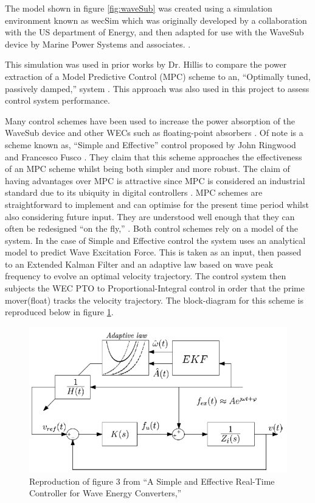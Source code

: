 \documentclass{report}
\begin{document}
The model shown in figure \ref{fig:waveSub}  was created using a simulation environment known as wecSim\cite{wecSim} which was originally developed by a collaboration with the US department of Energy, and then adapted for use with the WaveSub device by Marine Power Systems and associates. \cite{waveSub}.

This simulation was used in prior works by Dr. Hillis to compare the power extraction of a Model Predictive Control (MPC) scheme to an, ``Optimally tuned, passively damped,'' system \cite{andyMPC}. This approach was also used in this project to assess control system performance. 

Many control schemes have been used to increase the power absorption of the WaveSub device and other WECs such as floating-point absorbers \cite{abdelkhalik2017a}\cite{abdelkhalik2018a}. Of note is a scheme known as, ``Simple and Effective'' control proposed by John Ringwood and Francesco Fusco \cite{ringwood}. They claim that this scheme approaches the effectiveness of an MPC scheme whilst being both simpler and more robust. The claim of having advantages over MPC is attractive since MPC is considered an industrial standard due to its ubiquity in digital controllers \cite{gorinevsky2005a}. MPC schemes are straightforward to implement and can optimise for the present time period whilst also considering future input. They are understood well enough that they can often be redesigned ``on the fly,'' \cite{gorinevsky2005a}. Both control schemes rely on a model of the system. In the case of Simple and Effective control the system uses an analytical model to predict Wave Excitation Force. This is taken as an input, then passed to an Extended Kalman Filter and an adaptive law based on wave peak frequency to evolve an optimal velocity trajectory. The control system then subjects the WEC PTO to Proportional-Integral control in order that the prime mover(float) tracks the velocity trajectory. The block-diagram for this scheme is reproduced below in figure \ref{ringwoodBlockDiagram}. 

\begin{figure}
\centering
\includegraphics[height=0.4\textwidth]{graphics/ringwoodBlockDiagram}
\caption{Reproduction of figure 3 from ``A Simple and Effective Real-Time Controller for Wave Energy Converters,'' \cite{ringwood}}
\label{ringwoodBlockDiagram}
\end{figure}
\FloatBarrier
\end{document}
